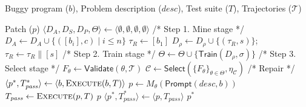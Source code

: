 \documentclass[conference]{IEEEtran}
\begin{document}
\begin{algorithm}[h]
\caption{\textsc{ZPDPatch}}
\label{alg:construct}
\footnotesize
\begin{algorithmic}[1]
\item[\textbf{Input:}] Buggy program ($b$), Problem description ($\mathit{desc}$), Test suite ($T$), Trajectories ($\mathcal T$)
\item[\textbf{Output:}] Patch ($p$)
\State $\langle D_A, D_S, D_P, \Theta\rangle\gets\langle\emptyset,\emptyset,\emptyset,\emptyset\rangle$ 
\Statex\hspace{\algorithmicindent}/* Step 1. Mine stage */
 
 \State $D_A\gets D_A\cup\{([b_i],c)\mid i\le n\}$ 
  
  \State $\tau_R\gets[b_1]$ 
    
    \State $D_\rho\gets D_\rho\cup\{(\tau_R,s)\}$; $\tau_R\gets \tau_R\mathbin{\|}[s]$
   \EndIf
  \EndFor
 \EndFor
\EndFor
\Statex\hspace{\algorithmicindent}/* Step 2. Train stage */
 
 \State $\Theta\gets\Theta\cup\{\mathsf{Train}(D_\rho,\sigma)\}$ 
\EndFor
\Statex\hspace{\algorithmicindent}/* Step 3. Select stage */
\For{$\theta\in\Theta$}
 \State $F_{\theta}\gets\mathsf{Validate}(\theta,\mathcal T)$ 
\EndFor
\State $\mathcal C\gets\mathsf{Select}(\{F_{\theta}\}_{\theta\in\Theta},\eta_{\mathcal C})$ 
\Statex\hspace{\algorithmicindent}/* Repair */
\State $\langle p^*,T_{\mathit{pass}}^*\rangle\gets\langle b,\textsc{Execute}(b,T)\rangle$
 \State $p\gets M_\theta(\mathsf{Prompt}(\mathit{desc},b))$
 \State $T_{\mathit{pass}}\gets\textsc{Execute}(p,T)$
  \State \Return $p$ \EndIf
  \State $\langle p^*,T_{\mathit{pass}}^*\rangle\gets\langle p,T_{\mathit{pass}}\rangle$ 
 \EndIf
\EndFor
\State \Return $p^*$ 
\EndProcedure
\end{algorithmic}
\end{algorithm}
\end{document}
